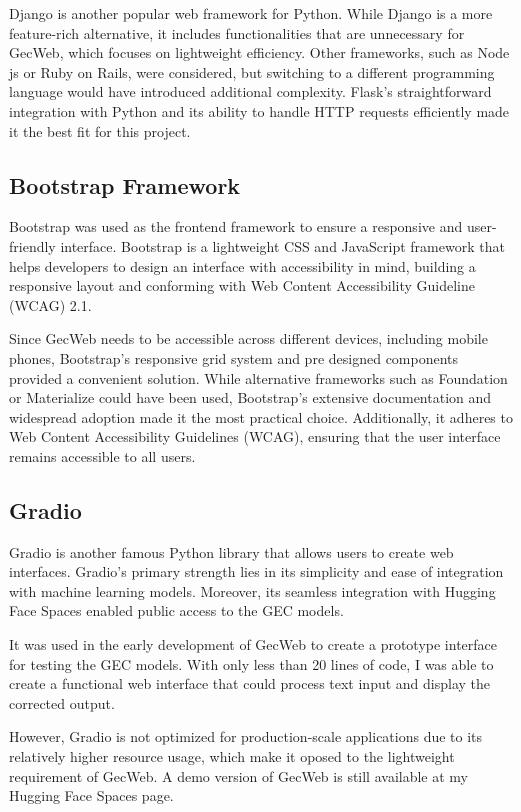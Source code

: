 Django is another popular web framework for Python.
While Django is a more feature-rich alternative, it includes functionalities that are unnecessary for GecWeb, which focuses on lightweight efficiency.
Other frameworks, such as Node js or Ruby on Rails, were considered, but switching to a different programming language would have introduced additional complexity.
Flask's straightforward integration with Python and its ability to handle HTTP requests efficiently made it the best fit for this project.

\subsection{Bootstrap Framework}
\label{bootstrap-framework}

Bootstrap was used as the frontend framework to ensure a responsive and user-friendly interface.
Bootstrap is a lightweight CSS and JavaScript framework that helps developers to design an interface with accessibility in mind, building a responsive layout and conforming with Web Content Accessibility Guideline (WCAG) 2.1.

Since GecWeb needs to be accessible across different devices, including mobile phones, Bootstrap's responsive grid system and pre designed components provided a convenient solution.
While alternative frameworks such as Foundation or Materialize could have been used, Bootstrap's extensive documentation and widespread adoption made it the most practical choice.
Additionally, it adheres to Web Content Accessibility Guidelines (WCAG), ensuring that the user interface remains accessible to all users.

\subsection{Gradio}
\label{gradio}

Gradio is another famous Python library that allows users to create web interfaces.
Gradio's primary strength lies in its simplicity and ease of integration with machine learning models.
Moreover, its seamless integration with Hugging Face Spaces enabled public access to the GEC models.

It was used in the early development of GecWeb to create a prototype interface for testing the GEC models.
With only less than 20 lines of code, I was able to create a functional web interface that could process text input and display the corrected output.

However, Gradio is not optimized for production-scale applications due to its relatively higher resource usage, which make it oposed to the lightweight requirement of GecWeb.
A demo version of GecWeb is still available at my Hugging Face Spaces page.


